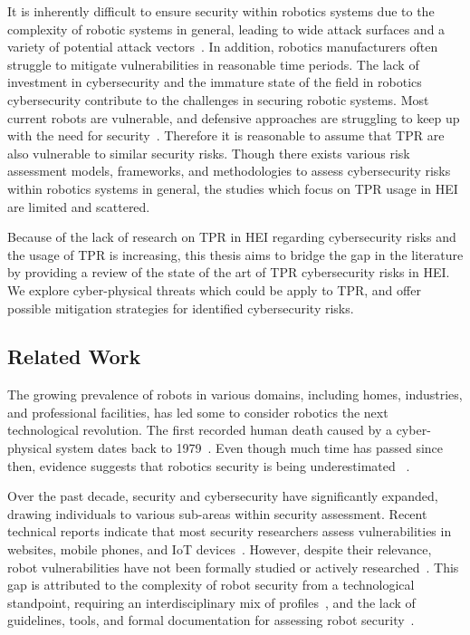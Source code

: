 It is inherently difficult to ensure security within robotics systems due to the complexity of robotic systems in general, leading to
wide
attack surfaces
and a variety
of potential attack vectors~\cite[2]{robot_security_review_2022}. In addition, robotics manufacturers often struggle to mitigate
vulnerabilities in reasonable time periods. The lack of investment in cybersecurity and the
immature state of the field in robotics cybersecurity contribute
to the challenges in securing robotic systems.
Most current robots are vulnerable, and defensive approaches are struggling
to keep up with the need for security~\cite[12]{robot_security_review_2022}. Therefore it is reasonable to assume that \ac{TPR} are also
vulnerable to similar security risks. Though there exists various risk assessment models, frameworks, and methodologies to assess
cybersecurity risks within robotics systems in general, the studies which focus on \ac{TPR} usage in \ac{HEI} are limited and scattered.

Because of the lack of research on \ac{TPR} in \ac{HEI} regarding cybersecurity risks and the usage of \ac{TPR}
is increasing, this thesis aims to bridge the gap in the literature by providing a review of the state of the art of
\ac{TPR} cybersecurity risks in \ac{HEI}. We explore cyber-physical threats which could be apply to \ac{TPR}, and offer possible
mitigation strategies for identified cybersecurity risks.

\subsection{Related Work}
The growing prevalence of robots in various domains, including homes, industries, and professional facilities, has led some to
consider robotics the next technological revolution. The first recorded human death caused by a cyber-physical system
dates back to 1979~\cite[2]{robot_security_review_2022}. Even though much time has passed since then, evidence suggests that robotics security is being underestimated
~\cite[1-2]{
  robot_security_framework_2018}.

Over the past decade, security and cybersecurity have significantly expanded, drawing individuals to various sub-areas within security
assessment. Recent technical reports indicate that most security researchers assess vulnerabilities in
websites, mobile phones, and \ac{IoT} devices~\cite[]{dbir_2022, robot_security_review_2022}.
However, despite their relevance, robot vulnerabilities have not been formally studied or actively researched~\cite[1]{robot_security_review_2022}. This gap is attributed to the complexity of robot security from a
technological standpoint, requiring an interdisciplinary mix of profiles~\cite[74-77]{introduction_to_robot_system_security_2021}, and the lack of guidelines, tools, and formal documentation
for assessing robot security~\cite[7]{cyber_security_issues_in_robotics_2021}.

